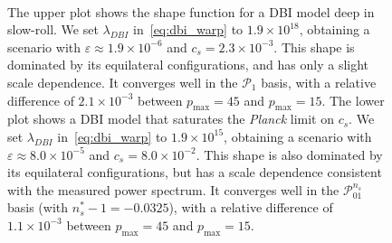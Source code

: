\documentclass[a4paper,12pt]{extarticle}
\newcommand{\Pmax}{p_\text{max}}
\newcommand{\Linvk}{\mathcal{P}_1}
\newcommand{\Lnsboth}{\mathcal{P}^{n_s}_{01}}
\begin{document}
\begin{figure}[!pth]
\centering
    \\[-2ex]
\caption{
    The upper plot shows the shape function for a DBI model
    deep in slow-roll. We set
    $\lambda_{DBI}$ in~\eqref{eq:dbi_warp} to $1.9\times10^{18}$,
    obtaining a scenario with $\varepsilon\approx1.9\times10^{-6}$ and
    $c_s=2.3\times10^{-3}$.
    This shape is dominated by its equilateral configurations,
    and has only a slight scale dependence.
    It converges well in the $\Linvk$ basis,
    with a relative difference of $2.1\times10^{-3}$
    between $\Pmax=45$ and $\Pmax=15$.
    The lower plot shows a DBI model that saturates the {\it{Planck}}
    limit on $c_s$. We set
    $\lambda_{DBI}$ in~\eqref{eq:dbi_warp} to $1.9\times10^{15}$,
    obtaining a scenario with $\varepsilon\approx8.0\times10^{-5}$ and
    $c_s=8.0\times10^{-2}$.
    This shape is also dominated by its equilateral configurations,
    but has a scale dependence consistent with the measured
    power spectrum.
    It converges well in the $\Lnsboth$ basis
    (with $n_s^{*}-1 = -0.0325$),
    with a relative difference of $1.1\times10^{-3}$
    between $\Pmax=45$ and $\Pmax=15$.
}\label{slice_plot_dbi}
\end{figure}
\end{document}
